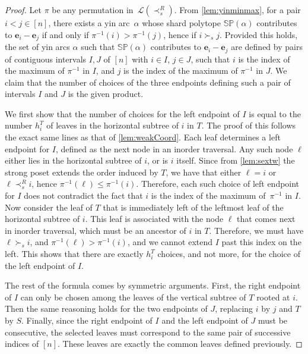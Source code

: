 \documentclass{amsart}
\theoremstyle{definition}
\renewcommand{\b}[1]{{\boldsymbol{#1}}} %
\newcommand{\polytope}[1]{\mathds{#1}} %
\newcommand{\SP}{\polytope{SP}}
\begin{document}
\begin{proof}
  Let $\pi$ be any permutation in~$\mathcal{L}(\prec_s^R)$.
  From \cref{lem:yinminmax}, for a pair $i<j \in [n]$, there exists a yin arc~$\alpha$ whose shard polytope $\SP(\alpha)$ contributes to $\b{e}_i-\b{e}_j$ if and only if $\pi^{-1}(i)>\pi^{-1}(j)$, hence if $i\succ_s j$.
  Provided this holds, the set of yin arcs $\alpha$ such that $\SP(\alpha)$ contributes to $\b{e}_i-\b{e}_j$ are defined by pairs of contiguous intervals $I,J$ of $[n]$ with $i\in I$, $j\in J$, such that $i$ is the index of the maximum of $\pi^{-1}$ in $I$, and $j$ is the index of the maximum of $\pi^{-1}$ in $J$.
  We claim that the number of choices of the three endpoints defining such a pair of intervals $I$ and $J$ is the given product.

  We first show that the number of choices for the left endpoint of $I$ is equal to the number $h^T_i$ of leaves in the horizontal subtree of $i$ in $T$.
  The proof of this follows the exact same lines as that of \cref{lem:weakCoord}.
  Each leaf determines a left endpoint for $I$, defined as the next node in an inorder traversal.
  Any such node $\ell$ either lies in the horizontal subtree of $i$, or is $i$ itself.
  Since from \cref{lem:sextw} the strong poset extends the order induced by $T$, we have that either $\ell=i$ or $\ell\prec_s^R i$, hence $\pi^{-1}(\ell)\leq \pi^{-1}(i)$.
  Therefore, each such choice of left endpoint for $I$ does not contradict the fact that $i$ is the index of the maximum of~$\pi^{-1}$ in $I$.
  Now consider the leaf of $T$ that is immediately left of the leftmost leaf of the horizontal subtree of $i$.
  This leaf is associated with the node $\ell$ that comes next in inorder traversal, which must be an ancestor of $i$ in $T$.
  Therefore, we must have $\ell\succ_s i$, and $\pi^{-1}(\ell) > \pi^{-1}(i)$, and we cannot extend $I$ past this index on the left.
  This shows that there are exactly $h^T_i$ choices, and not more, for the choice of the left endpoint of $I$.

  The rest of the formula comes by symmetric arguments.
  First, the right endpoint of $I$ can only be chosen among the leaves of the vertical subtree of $T$ rooted at $i$.
  Then the same reasoning holds for the two endpoints of $J$, replacing $i$ by $j$ and $T$ by $S$.
  Finally, since the right endpoint of $I$ and the left endpoint of $J$ must be consecutive, the selected leaves must correspond to the same pair of successive indices of $[n]$.
  These leaves are exactly the common leaves defined previously.
\end{proof}
\end{document}
